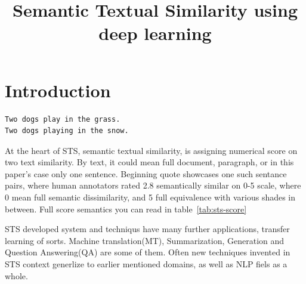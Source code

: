 \documentclass[10pt, a4paper]{article}
\title{Semantic Textual Similarity using deep learning}
\begin{document}
\maketitleabstract

\section{Introduction}

\begin{verbatim}
Two dogs play in the grass.
Two dogs playing in the snow.
\end{verbatim}

At the heart of STS, semantic textual similarity, is assigning numerical score on two text similarity. By text, it could mean full document, paragraph, or in this paper's case only one sentence. Beginning quote showcases one such sentance pairs, where human annotators rated 2.8 semantically similar on 0-5 scale, where 0 mean full semantic dissimilarity, and 5 full equivalence with various shades in between. Full score semantics you can read in table~\ref{tab:sts-score}


STS developed system and techniqus have many further applications, transfer learning of sorts. Machine translation(MT), Summarization, Generation and Question Answering(QA) are some of them. Often new techniques invented in STS context generlize to earlier mentioned domains, as well as NLP fiels as a whole.
\end{document}
